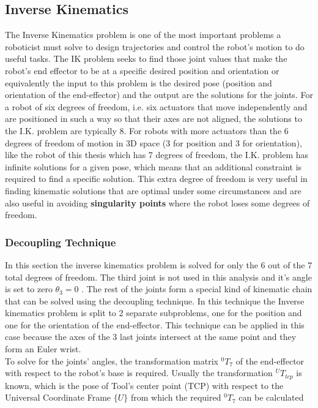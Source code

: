 \subsection{Inverse Kinematics}

The Inverse Kinematics problem is one of the most important problems a roboticist must solve to design trajectories and control the robot's motion to do useful tasks. The IK problem seeks to find 
those joint values that make the robot's end effector to be at a specific desired position and orientation or equivalently the input to this problem is the desired pose (position and orientation of the end-effector) 
and the output are the solutions for the joints. For a robot of six degrees of freedom, i.e. six actuators that move independently and are positioned in such a way so that their axes are not aligned, the solutions 
to the I.K. problem are typically 8. For robots with more actuators than the 6 degrees of freedom of motion in 3D space (3 for position and 3 for orientation), like the robot of this thesis which has 7 degrees of freedom, 
the I.K. problem has infinite solutions for a given pose, which means that an additional constraint is required to find a specific solution. This extra degree of freedom is very useful in finding kinematic solutions 
that are optimal under some circumstances and are also useful in avoiding \textbf{singularity points} where the robot loses some degrees of freedom.

\subsubsection{Decoupling Technique}

In this section the inverse kinematics problem is solved for only the 6 out of the 7 total degrees of freedom. The third joint is not used in this 
analysis and it's angle is set to zero $θ_3 = 0$ . The rest of the joints form a special kind of kinematic chain that can be solved using the 
decoupling technique. In this technique the Inverse kinematics problem is split to 2 separate subproblems, one for the position and one for the 
orientation of the end-effector. This technique can be applied in this case because the axes of the 3 last joints intersect at the same point and 
they form an Euler wrist. \\

To solve for the joints' angles, the transformation matrix $^0T_7$ of the end-effector with respect to the robot's base is required. Usually the transformation ${}^UT_{tcp}$ is known, which is the pose of Tool's center point (TCP) with respect to the Universal Coordinate Frame $\lbrace U \rbrace$ from which the required $^0T_7$ can be calculated

